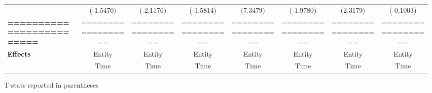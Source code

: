 \begin{center}
\begin{tabular}{lccccccc}
\textbf{ }                         &      (-1.5470)       &          (-2.1176)          &          (-1.5814)           &               (7.3479)              &            (-1.9780)             &           (2.3179)          &           (-0.1003)            \\
\textbf{=========================} &  ==================  &      ==================     &      ==================      &          ==================         &        ==================        &      ==================     &       ==================       \\
\textbf{Effects}                   &        Entity        &            Entity           &            Entity            &                Entity               &              Entity              &            Entity           &             Entity             \\
\textbf{}                          &         Time         &             Time            &             Time             &                 Time                &               Time               &             Time            &              Time              \\
\bottomrule
\end{tabular}
\end{center}

T-stats reported in parentheses